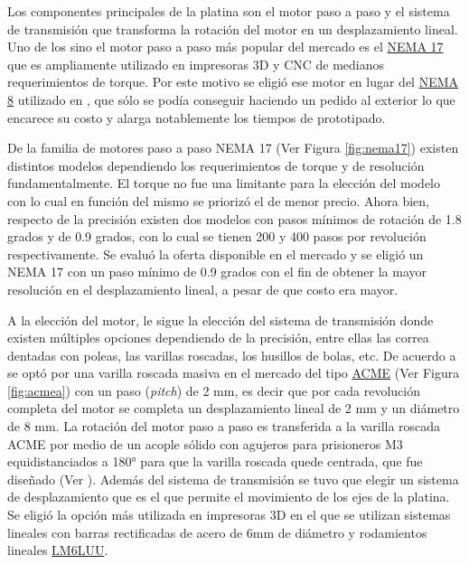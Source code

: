 Los componentes principales de la platina son el motor paso a paso y el sistema de transmisión que transforma la rotación del motor en un desplazamiento lineal. Uno de los sino el motor paso a paso más popular del mercado es el \href{https://www.pololu.com/product/1200}{NEMA 17} que es ampliamente utilizado en impresoras 3D y CNC de medianos requerimientos de torque. Por este motivo se eligió ese motor en lugar del \href{https://www.pololu.com/product/1204}{NEMA 8} utilizado en \cite{schaa}, que sólo se podía conseguir haciendo un pedido al exterior lo que encarece su costo y alarga notablemente los tiempos de prototipado.

De la familia de motores paso a paso NEMA 17 (Ver Figura \ref{fig:nema17}) existen distintos modelos dependiendo los requerimientos de torque y de resolución fundamentalmente. El torque no fue una limitante para la elección del modelo con lo cual en función del mismo se priorizó el de menor precio. Ahora bien, respecto de la precisión existen dos modelos con pasos mínimos de rotación de 1.8 grados y de 0.9 grados, con lo cual se tienen 200 y 400 pasos por revolución respectivamente. Se evaluó la oferta disponible en el mercado y se eligió un NEMA 17 con un paso mínimo de 0.9 grados con el fin de obtener la mayor resolución en el desplazamiento lineal, a pesar de que costo era mayor.

A la elección del motor, le sigue la elección del sistema de transmisión donde existen múltiples opciones dependiendo de la precisión, entre ellas las correa dentadas con poleas, las varillas roscadas, los husillos de bolas, etc. De acuerdo a \cite{schaa} se optó por una varilla roscada masiva en el mercado del tipo \href{https://www.mcmaster.com/acme-screws/acme-lead-screws-and-nuts/}{ACME} (Ver Figura \ref{fig:acmea}) con un paso (\textit{pitch}) de 2 mm, es decir que por cada revolución completa del motor se completa un desplazamiento lineal de 2 mm y un diámetro de 8 mm. La rotación del motor paso a paso es transferida a la varilla roscada ACME por medio de un acople sólido con agujeros para prisioneros M3 equidistanciados a 180° para que la varilla roscada quede centrada, que fue diseñado (Ver \href{https://github.com/jrr1984/open_frame_XYStage/blob/master/3dprintedparts/STLs/acopleRIGIDO.STL}{\faCubes}). Además del sistema de transmisión se tuvo que elegir un sistema de desplazamiento que es el que permite el movimiento de los ejes de la platina. Se eligió la opción más utilizada en impresoras 3D en el que se utilizan sistemas lineales con barras rectificadas de acero de 6mm de diámetro y rodamientos lineales \href{https://uk.misumi-ec.com/vona2/detail/221000091678/?HissuCode=LM6LUU}{LM6LUU}.

